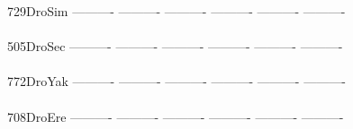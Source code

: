 \documentclass[11pt,twoside,reqno,a4paper]{article}
\begin{document}
{729\hspace*{2\charwidth}DroSim	----------	----------	----------	----------	----------	----------	\\
\hspace*{5\charwidth}\hspace*{7\charwidth}\hspace*{1\charwidth}\hspace*{1\charwidth}\hspace*{1\charwidth}\hspace*{1\charwidth}\hspace*{1\charwidth}\hspace*{1\charwidth}\\
505\hspace*{2\charwidth}DroSec	----------	----------	----------	----------	----------	----------	\\
\hspace*{5\charwidth}\hspace*{7\charwidth}\hspace*{1\charwidth}\hspace*{1\charwidth}\hspace*{1\charwidth}\hspace*{1\charwidth}\hspace*{1\charwidth}\hspace*{1\charwidth}\\
772\hspace*{2\charwidth}DroYak	----------	----------	----------	----------	----------	----------	\\
\hspace*{5\charwidth}\hspace*{7\charwidth}\hspace*{1\charwidth}\hspace*{1\charwidth}\hspace*{1\charwidth}\hspace*{1\charwidth}\hspace*{1\charwidth}\hspace*{1\charwidth}\\
708\hspace*{2\charwidth}DroEre	----------	----------	----------	----------	----------	----------	\\
\hspace*{5\charwidth}\hspace*{7\charwidth}\hspace*{1\charwidth}\hspace*{1\charwidth}\hspace*{1\charwidth}\hspace*{1\charwidth}\hspace*{1\charwidth}\hspace*{1\charwidth}\\
}
\end{document}
